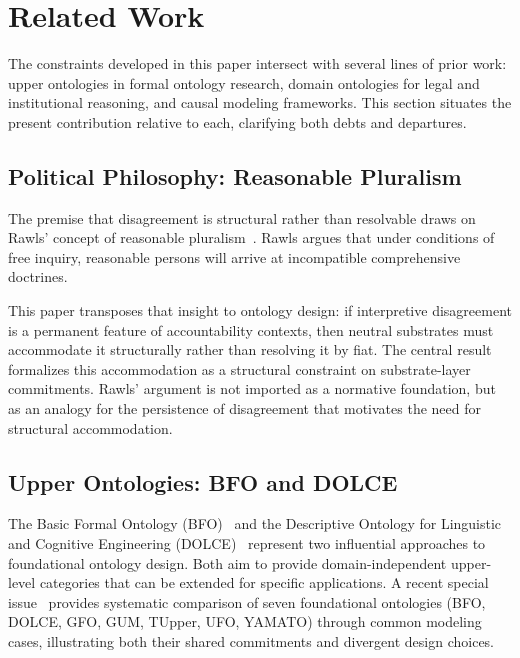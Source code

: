 
\section{Related Work}
\label{sec:related}

The constraints developed in this paper intersect with several lines of prior work:
upper ontologies in formal ontology research,
domain ontologies for legal and institutional reasoning,
and causal modeling frameworks.
This section situates the present contribution
relative to each, clarifying both debts and departures.

\subsection{Political Philosophy: Reasonable Pluralism}

The premise that disagreement is structural rather than resolvable
draws on Rawls' concept of reasonable pluralism~\citep{rawls1993political}.
Rawls argues that under conditions of free inquiry,
reasonable persons will arrive at incompatible comprehensive doctrines.

This paper transposes that insight to ontology design:
if interpretive disagreement is a permanent feature of accountability contexts,
then neutral substrates must accommodate it structurally
rather than resolving it by fiat.
The central result formalizes this accommodation
as a structural constraint on substrate-layer commitments.
Rawls' argument is not imported as a normative foundation,
but as an analogy for the persistence of disagreement
that motivates the need for structural accommodation.

\subsection{Upper Ontologies: BFO and DOLCE}

The Basic Formal Ontology
(BFO)~\citep{iso2021bfo,arp2015bfo} and
the Descriptive Ontology for Linguistic and Cognitive Engineering
(DOLCE)~\citep{borgo2022dolce,masolo2003dolce}
represent two influential approaches to foundational ontology design.
Both aim to provide domain-independent upper-level categories
that can be extended for specific applications.
A recent special issue~\citep{borgo2022foundational} provides systematic
comparison of seven foundational ontologies
(BFO, DOLCE, GFO, GUM, TUpper, UFO, YAMATO)
through common modeling cases,
illustrating both their shared commitments
and divergent design choices.

